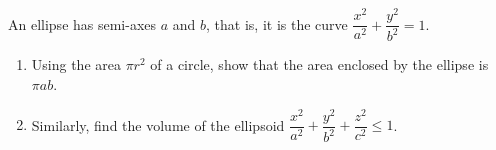 An ellipse has semi-axes $a$ and $b$, that is, it is the curve $\dfrac{x^2}{a^2}+\dfrac{y^2}{b^2}=1$.
\begin{enumerate}
\item[(a)] Using the area $\pi r^2$ of a circle, show that the area enclosed by the ellipse is $\pi ab$.
\item[(b)] Similarly, find the volume of the ellipsoid $\dfrac{x^2}{a^2}+\dfrac{y^2}{b^2}+\dfrac{z^2}{c^2}\le1$.
\end{enumerate}
